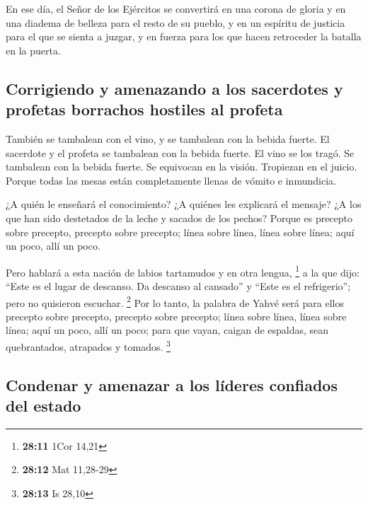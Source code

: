 En ese día, el Señor de los Ejércitos se convertirá en
una corona de gloria y en una diadema de belleza para el resto de su
pueblo,  y en un espíritu de justicia para el que se
sienta a juzgar, y en fuerza para los que hacen retroceder la batalla en
la puerta.

\hypertarget{corrigiendo-y-amenazando-a-los-sacerdotes-y-profetas-borrachos-hostiles-al-profeta}{%
\subsection{Corrigiendo y amenazando a los sacerdotes y profetas
borrachos hostiles al
profeta}\label{corrigiendo-y-amenazando-a-los-sacerdotes-y-profetas-borrachos-hostiles-al-profeta}}

 También se tambalean con el vino, y se tambalean con la
bebida fuerte. El sacerdote y el profeta se tambalean con la bebida
fuerte. El vino se los tragó. Se tambalean con la bebida fuerte. Se
equivocan en la visión. Tropiezan en el juicio.  Porque
todas las mesas están completamente llenas de vómito e inmundicia.

 ¿A quién le enseñará el conocimiento? ¿A quiénes les
explicará el mensaje? ¿A los que han sido destetados de la leche y
sacados de los pechos?  Porque es precepto sobre
precepto, precepto sobre precepto; línea sobre línea, línea sobre línea;
aquí un poco, allí un poco.

 Pero hablará a esta nación de labios tartamudos y en
otra lengua, \footnote{\textbf{28:11} 1Cor 14,21}  a la
que dijo: ``Este es el lugar de descanso. Da descanso al cansado'' y
``Este es el refrigerio''; pero no quisieron escuchar. \footnote{\textbf{28:12}
  Mat 11,28-29}  Por lo tanto, la palabra de Yahvé será
para ellos precepto sobre precepto, precepto sobre precepto; línea sobre
línea, línea sobre línea; aquí un poco, allí un poco; para que vayan,
caigan de espaldas, sean quebrantados, atrapados y tomados. \footnote{\textbf{28:13}
  Is 28,10}

\hypertarget{condenar-y-amenazar-a-los-luxedderes-confiados-del-estado}{%
\subsection{Condenar y amenazar a los líderes confiados del
estado}\label{condenar-y-amenazar-a-los-luxedderes-confiados-del-estado}}

